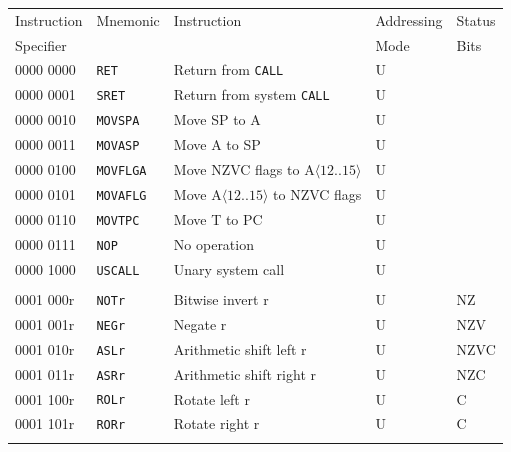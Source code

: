 \documentclass[10pt,fleqn]{book}
\begin{document}
\newpage


\begin{tabular}{ l l l l l }
\toprule
Instruction & Mnemonic       & Instruction                                 & Addressing    & Status\\
Specifier   &                &                                             & Mode          & Bits\\
\midrule

0000 0000   & \verb|RET|     & Return from \verb|CALL|                     & U \\
0000 0001   & \verb|SRET|    & Return from system \verb|CALL|              & U \\
0000 0010   & \verb|MOVSPA|  & Move SP to A                                & U \\
0000 0011   & \verb|MOVASP|  & Move A to SP                                & U \\  
0000 0100   & \verb|MOVFLGA| & Move NZVC flags to A$\langle12..15\rangle$  & U \\
0000 0101   & \verb|MOVAFLG| & Move A$\langle12..15\rangle$ to NZVC flags  & U \\
0000 0110   & \verb|MOVTPC|  & Move T to PC                                & U \\
0000 0111   & \verb|NOP|     & No operation                                & U \\
0000 1000   & \verb|USCALL|  & Unary system call                           & U \\
 \\
0001 000r   & \verb|NOTr|    & Bitwise invert r                            & U                    & NZ \\
0001 001r   & \verb|NEGr|    & Negate r                                    & U                    & NZV \\
0001 010r   & \verb|ASLr|    & Arithmetic shift left r                     & U                    & NZVC \\
0001 011r   & \verb|ASRr|    & Arithmetic shift right r                    & U                    & NZC \\
0001 100r   & \verb|ROLr|    & Rotate left r                               & U                    & C \\
0001 101r   & \verb|RORr|    & Rotate right r                              & U                    & C \\
 \\

\end{tabular}
\end{document}
